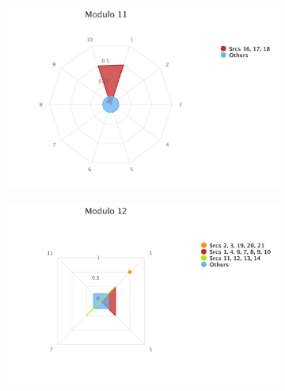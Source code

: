 \begin{figure}[H]
\begin{subfigure}{0.45\textwidth}
	\includegraphics[width=\linewidth]{tex/images/analysis/mod11}
\end{subfigure}
\hfill
\begin{subfigure}{0.45\textwidth}
	\includegraphics[width=\linewidth]{tex/images/analysis/mod12}
\end{subfigure}\\


\end{figure}
